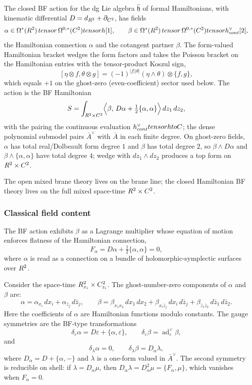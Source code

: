 \documentclass[11pt]{memoir}
\begin{document}
The closed BF action for the dg Lie algebra
$\widehat{\mathfrak h}$ of formal Hamiltonians, with kinematic differential
$D=d_{R^2}+\partial_{C^2}$, has fields
$$\alpha\in\Omega^*(R^2)\,tensor\,\Omega^{0,*}(C^2)
  tensorh[1],\qquad
  \beta\in\Omega^*(R^2)\,tensor\,\Omega^{0,*}(C^2)
  tensorh^{\vee}_{cont}[2],$$
the Hamiltonian connection $\alpha$ and the cotangent partner $\beta$.
The form-valued Hamiltonian bracket wedges the form factors and takes the
Poisson bracket on the Hamiltonian entries with the tensor-product Koszul
sign,
$$[\eta\otimes f,\theta\otimes g]
  =(-1)^{|f||\theta|}(\eta\wedge\theta)\otimes\{f,g\},$$
which equals $+1$ on the ghost-zero (even-coefficient) sector used below.
The action is the BF Hamiltonian
$$S=\int_{R^2\times C^2}\Bigl\langle\beta,\,
  D\alpha+\tfrac12\{\alpha,\alpha\}\Bigr\rangle\,dz_1\,dz_2,$$
with the pairing the continuous evaluation
$h^{\vee}_{cont}tensorhtoC$;
the dense polynomial submodel pairs $\bar A^\vee$ with $\bar A$ in each finite
degree. On ghost-zero fields, $\alpha$ has total real/Dolbeault form degree
$1$ and $\beta$ has total degree $2$, so $\beta\wedge D\alpha$ and
$\beta\wedge\{\alpha,\alpha\}$ have total degree $4$; wedge with $dz_1\wedge
dz_2$ produces a top form on $R^2\times C^2$.

\begin{rmk}
  The open mixed brane theory lives on the brane line; the closed Hamiltonian
  BF theory lives on the full mixed space-time $R^2\times C^2$.
\end{rmk}

\subsubsection{Classical field content}

The BF action exhibits $\beta$ as a Lagrange multiplier whose equation of
motion enforces flatness of the Hamiltonian connection,
$$F_\alpha = D\alpha + \tfrac{1}{2}\{\alpha,\alpha\}=0,$$
where $\alpha$ is read as a connection on a bundle of holomorphic-symplectic
surfaces over $R^2$.

Consider the space-time $R^2_{x_i}\times C^2_{z_i}$. The ghost-number-zero
components of $\alpha$ and $\beta$ are:
$$\alpha = \alpha_{x_i}\,dx_i + \alpha_{\bar z_j}\,d\bar z_j,\qquad
  \beta = \beta_{x_1 x_2}\,dx_1\,dx_2 + \beta_{x_i\bar z_j}\,dx_i\,d\bar z_j
  + \beta_{\bar z_1\bar z_2}\,d\bar z_1\,d\bar z_2.$$
Here the coefficients of $\alpha$ are Hamiltonian functions modulo constants.
The gauge symmetries are the BF-type transformations
$$\delta_{\varepsilon}\alpha=D\varepsilon+\{\alpha,\varepsilon\},\qquad
  \delta_{\varepsilon}\beta=\operatorname{ad}^{\vee}_{\varepsilon}\beta,$$
and
$$\delta_{\lambda}\alpha=0,\qquad
  \delta_{\lambda}\beta=D_{\alpha}\lambda,$$
where $D_{\alpha}=D+\{\alpha,-\}$ and $\lambda$ is a one-form valued in
$\bar A^{\vee}$. The second symmetry is reducible on shell: if
$\lambda=D_{\alpha}\mu$, then
$D_{\alpha}\lambda=D_{\alpha}^2\mu=\{F_{\alpha},\mu\}$, which vanishes when
$F_{\alpha}=0$.
\end{document}
